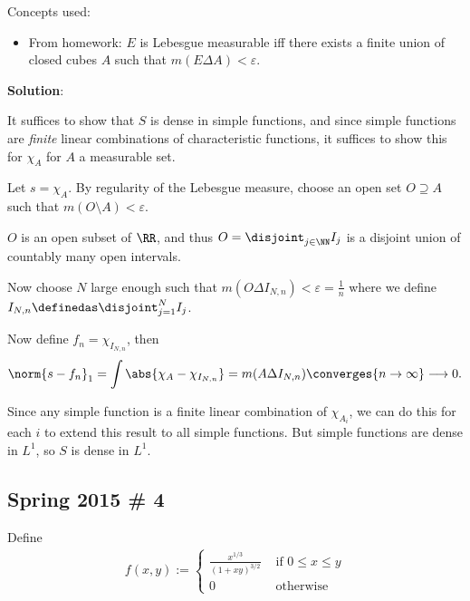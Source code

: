 \begin{solution}

Concepts used:

\begin{itemize}
\tightlist
\item
  From homework: \(E\) is Lebesgue measurable iff there exists a finite
  union of closed cubes \(A\) such that \(m(E\Delta A) < \varepsilon\).
\end{itemize}

\textbf{Solution}:

It suffices to show that \(S\) is dense in simple functions, and since
simple functions are \emph{finite} linear combinations of characteristic
functions, it suffices to show this for \(\chi_A\) for \(A\) a
measurable set.

Let \(s = \chi_{A}\). By regularity of the Lebesgue measure, choose an
open set \(O \supseteq A\) such that \(m(O\setminus A) < \varepsilon\).

\(O\) is an open subset of \(\RR\), and thus
\(O = \disjoint_{j\in \NN} I_j\) is a disjoint union of countably many
open intervals.

Now choose \(N\) large enough such that
\(m(O \Delta I_{N, n}) < \varepsilon = \frac 1 n\) where we define
\(I_{N, n} \definedas \disjoint_{j=1}^N I_j\).

Now define \(f_n = \chi_{I_{N, n}}\), then \begin{align*}
\norm{s - f_n}_1 = \int \abs{\chi_A - \chi_{I_{N, n}}} = m(A \Delta I_{N, n}) \converges{n\to\infty}\longrightarrow 0
.\end{align*}

Since any simple function is a finite linear combination of
\(\chi_{A_i}\), we can do this for each \(i\) to extend this result to
all simple functions. But simple functions are dense in \(L^1\), so
\(S\) is dense in \(L^1\).

\end{solution}

\hypertarget{spring-2015-4}{%
\subsection{Spring 2015 \# 4}\label{spring-2015-4}}

Define
\begin{align*}
f(x, y):=\left\{\begin{array}{ll}{\frac{x^{1 / 3}}{(1+x y)^{3 / 2}}} & {\text { if } 0 \leq x \leq y} \\ {0} & {\text { otherwise }}\end{array}\right.
\end{align*}

